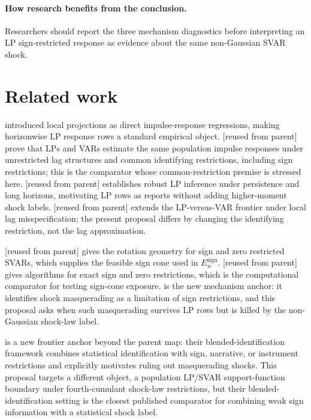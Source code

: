 \documentclass[11pt]{article}
\theoremstyle{definition}
\theoremstyle{plain}
\theoremstyle{remark}
\begin{document}
\paragraph{How research benefits from the conclusion.}
Researchers should report the three mechanism diagnostics before interpreting an LP sign-restricted response as evidence about the same non-Gaussian SVAR shock.

\section{Related work}
\citet{Jorda2005} introduced local projections as direct impulse-response regressions, making horizonwise LP response rows a standard empirical object.  \citet{PlagborgMollerWolf2021} [reused from parent] prove that LPs and VARs estimate the same population impulse responses under unrestricted lag structures and common identifying restrictions, including sign restrictions; this is the comparator whose common-restriction premise is stressed here.  \citet{MontielOleaPlagborgMoller2021} [reused from parent] establishes robust LP inference under persistence and long horizons, motivating LP rows as reports without adding higher-moment shock labels.  \citet{MontielOleaPlagborgMollerQianWolf2024} [reused from parent] extends the LP-versus-VAR frontier under local lag misspecification; the present proposal differs by changing the identifying restriction, not the lag approximation.

\citet{AriasRubioRamirezWaggoner2018} [reused from parent] gives the rotation geometry for sign and zero restricted SVARs, which supplies the feasible sign cone used in \(E_w^{\mathrm{sign}}\).  \citet{Read2022} [reused from parent] gives algorithms for exact sign and zero restrictions, which is the computational comparator for testing sign-cone exposure.  \citet{Wolf2022} is the new mechanism anchor: it identifies shock masquerading as a limitation of sign restrictions, and this proposal asks when such masquerading survives LP rows but is killed by the non-Gaussian shock-law label.

\citet{CarrieroMarcellinoTornese2024} is a new frontier anchor beyond the parent map: their blended-identification framework combines statistical identification with sign, narrative, or instrument restrictions and explicitly motivates ruling out masquerading shocks.  This proposal targets a different object, a population LP/SVAR support-function boundary under fourth-cumulant shock-law restrictions, but their blended-identification setting is the closest published comparator for combining weak sign information with a statistical shock label.
\end{document}
